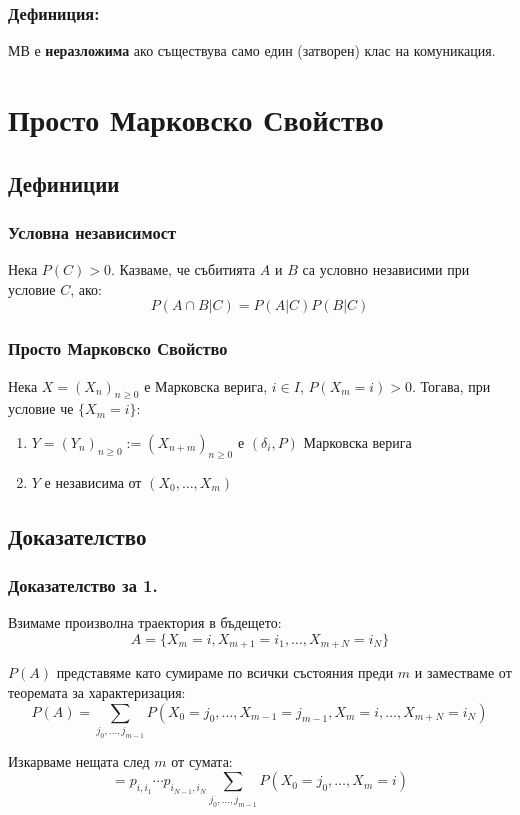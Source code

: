 \documentclass{article}
\begin{document}
\subsubsection*{Дефиниция:}
МВ е \textbf{неразложима} ако съществува само един (затворен) клас на комуникация.

\section{Просто Марковско Свойство}
\subsection{Дефиниции}
\subsubsection*{Условна независимост}
Нека $P(C) > 0$. Казваме, че събитията $A$ и $B$ са условно независими при условие $C$, ако:
$$P(A \cap B | C) = P(A | C)P(B | C)$$

\subsubsection*{Просто Марковско Свойство}
Нека $X = (X_n)_{n\geq0}$ е Марковска верига, $i \in I$, $P(X_m = i) > 0$. Тогава, при условие че $\{X_m = i\}$:
\begin{enumerate}
\item $Y = (Y_n)_{n\geq0} := (X_{n+m})_{n\geq0}$ е $(\delta_i, P)$ Марковска верига
\item $Y$ е независима от $(X_0, \dots, X_m)$
\end{enumerate}

\subsection{Доказателство}
\subsubsection*{Доказателство за 1.}
Взимаме произволна траектория в бъдещето:
$$A = \{X_m = i, X_{m+1} = i_1, \dots, X_{m+N} = i_N\}$$

$P(A)$ представяме като сумираме по всички състояния преди $m$ и заместваме от теоремата за характеризация:
$$P(A) = \sum_{j_0,\dots,j_{m-1}} P(X_0 = j_0, \dots, X_{m-1} = j_{m-1}, X_m = i, \dots, X_{m+N} = i_N)$$

Изкарваме нещата след $m$ от сумата:
$$= p_{i,i_1}\cdots p_{i_{N-1},i_N} \sum_{j_0,\dots,j_{m-1}} P(X_0 = j_0, \dots, X_{m} = i)$$
\end{document}

